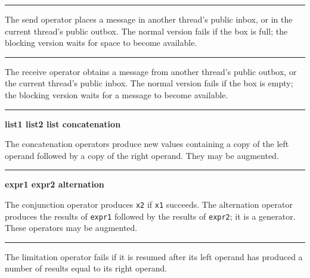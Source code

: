 \bigskip\hrule\vspace{0.1cm}
 \linebreak
{}

\noindent The send operator places a message in another thread's public
inbox, or in the current thread's public outbox. The normal version fails
if the box is full; the blocking version waits for space to become
available.

\bigskip\hrule\vspace{0.1cm}
 \linebreak
{}

\noindent The receive operator obtains a message from another thread's public
outbox, or the current thread's public inbox. The normal version fails
if the box is empty; the blocking version waits for a message to become
available.

\bigskip\hrule\vspace{0.1cm}

\noindent
{\bf list1 {\textbar}{\textbar}{\textbar} list2 \hfill list concatenation}

\noindent The concatenation operators produce new values
containing a copy of the left operand followed by a copy of the right
operand. They may be augmented.

\bigskip\hrule\vspace{0.1cm}

\noindent
{\bf expr1 {\textbar} expr2 \hfill alternation}

\noindent
The conjunction operator produces \texttt{x2} if
\texttt{x1} succeeds. The alternation operator produces the results of \texttt{expr1} followed
by the results of \texttt{expr2}; it is a generator.
These operators may be augmented.

\bigskip\hrule\vspace{0.1cm}

\noindent
The limitation operator fails if it
is resumed after its left operand has produced a number of results
equal to its right operand.

